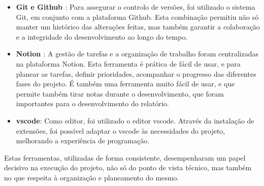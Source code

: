 \begin{itemize}
    \item \textbf{Git \cite{git} e Github \cite{github}}: Para assegurar o controlo de versões, foi utilizado o sistema Git, em conjunto com a plataforma Github. Esta combinação permitiu não só manter um histórico  das alterações feitas, mas também garantir a colaboração e a integridade do desenvolvimento ao longo do tempo.

    \item \textbf{Notion \cite{notion}}: A gestão de tarefas e a organização de trabalho foram centralizadas na plataforma Notion. Esta ferramenta é prática de fácil de usar, e para planear as tarefas, definir prioridades, acompanhar o progresso das diferentes fases do projeto. É também uma ferramenta muito fácil de usar, e que permite também tirar notas durante o desenvolvimento, que foram importantes para o desenvolvimento do relatório.

    \item \textbf{\gls{vscode}\cite{vscode}}: Como editor, foi utilizado o editor \gls{vscode}. Através da instalação de extensões, foi possível adaptar o \gls{vscode} às necessidades do projeto, melhorando a experiência de programação.
\end{itemize}

Estas ferramentas, utilizadas de forma consistente, desempenharam um papel decisivo na execução do projeto, não só do ponto de vista técnico, mas também no que respeita à organização e planeamento do mesmo.
